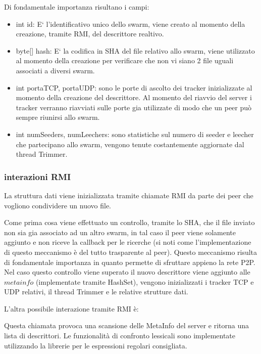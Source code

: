 Di fondamentale importanza risultano i campi:
\begin{itemize}
\item int id: E` l'identificativo unico dello swarm, viene creato al momento della creazione, tramite RMI, del descrittore realtivo.
\item byte[] hash: E` la codifica in SHA del file relativo allo swarm, viene utilizzato al momento della creazione per verificare che non vi siano 2 file uguali associati a diversi swarm.
\item int portaTCP, portaUDP: sono le porte di ascolto dei tracker inizializzate al momento della creazione del descrittore. Al momento del riavvio del server i tracker verranno riavviati sulle porte gia utilizzate di modo che un peer pu\`o sempre riunirsi allo swarm.
\item int numSeeders, numLeechers: sono statistiche sul numero di seeder e leecher che partecipano allo swarm, vengono tenute costantemente aggiornate dal thread Trimmer.
\end{itemize}

\subsubsection{interazioni RMI}

La struttura dati viene inizializzata tramite chiamate RMI da parte dei peer che vogliono condividere un nuovo file. 



Come prima cosa viene effettuato un controllo, tramite lo SHA, che il file inviato non sia gia associato ad un altro swarm, in tal caso il peer viene solamente aggiunto e non riceve la callback per le ricerche (si noti come l'implementazione di questo meccanismo \`e del tutto trasparente al peer). Questo meccanismo risulta di fondamentale importanza in quanto permette di sfruttare appieno la rete P2P. Nel caso questo controllo viene superato il nuovo descrittore viene aggiunto alle $metainfo$ (implementate tramite HashSet), vengono inizializzati i tracker TCP e UDP relativi, il thread Trimmer e le relative strutture dati.

L'altra possibile interazione tramite RMI \`e:



Questa chiamata provoca una scansione delle MetaInfo del server e ritorna una lista di descrittori. Le funzionalit\`a di confronto lessicali sono implementate utilizzando la librerie per le espressioni regolari consigliata.


